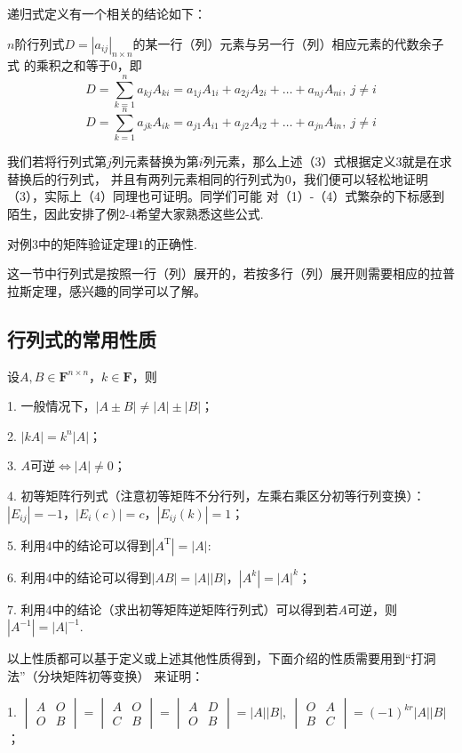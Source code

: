递归式定义有一个相关的结论如下：
\begin{theorem}
	$n$阶行列式$D=|a_{ij}|_{n \times n}$的某一行（列）元素与另一行（列）相应元素的代数余子式
	的乘积之和等于$0$，即
	\begin{equation}
		D=\sum_{k=1}^{n}a_{kj}A_{ki}=a_{1j}A_{1i}+a_{2j}A_{2i}+\dots+a_{nj}A_{ni},\ j \neq i
	\end{equation}
	\begin{equation}
		D=\sum_{k=1}^{n}a_{jk}A_{ik}=a_{j1}A_{i1}+a_{j2}A_{i2}+\dots+a_{jn}A_{in},\ j \neq i
	\end{equation}
\end{theorem}
我们若将行列式第$j$列元素替换为第$i$列元素，那么上述（3）式根据定义3就是在求替换后的行列式，
并且有两列元素相同的行列式为0，我们便可以轻松地证明（3），实际上（4）同理也可证明。同学们可能
对（1）-（4）式繁杂的下标感到陌生，因此安排了例2-4希望大家熟悉这些公式.
\begin{example}
	对例$3$中的矩阵验证定理$1$的正确性.
\end{example}
这一节中行列式是按照一行（列）展开的，若按多行（列）展开则需要相应的拉普拉斯定理，感兴趣的同学可以了解。
\subsection{行列式的常用性质}
设$A,B \in \mathbf{F}^{n \times n}$，$k \in \mathbf{F}$，则

1. 一般情况下，$|A \pm B| \neq |A|\pm|B|$；

2. $|kA|=k^n|A|$；

3. $A$可逆$\iff |A| \neq 0$；

4. 初等矩阵行列式（注意初等矩阵不分行列，左乘右乘区分初等行列变换）：$|E_{ij}|=-1$，$|E_i(c)|=c$，$|E_{ij}(k)|=1$；

5. 利用4中的结论可以得到$|A^\mathrm{T}|=|A|$:

6. 利用4中的结论可以得到$|AB|=|A||B|$，$|A^k|=|A|^k$；

7. 利用4中的结论（求出初等矩阵逆矩阵行列式）可以得到若$A$可逆，则$|A^{-1}|=|A|^{-1}$.

以上性质都可以基于定义或上述其他性质得到，下面介绍的性质需要用到“打洞法”（分块矩阵初等变换）
来证明：

1. $\begin{vmatrix}
	A & O \\ O & B
\end{vmatrix} = \begin{vmatrix}
	A & O \\ C & B
\end{vmatrix} = \begin{vmatrix}
	A & D \\ O & B
\end{vmatrix} = |A||B|,\ \begin{vmatrix}
	O & A \\ B & C
\end{vmatrix} = (-1)^{kr}|A||B|$；

